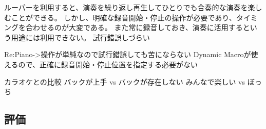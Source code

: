 
ルーパーを利用すると、演奏を繰り返し再生してひとりでも合奏的な演奏を楽しむことができる。
しかし、明確な録音開始・停止の操作が必要であり、タイミングを合わせるのが大変である。
また常に録音しておき、演奏に活用するという用途には利用できない。
試行錯誤しづらい


Re:Piano->操作が単純なので試行錯誤しても苦にならない
Dynamic Macroが使えるので、正確に録音開始・停止位置を指定する必要がない

カラオケとの比較
バックが上手 vs バックが存在しない
みんなで楽しい vs ぼっち

\subsection{評価}
